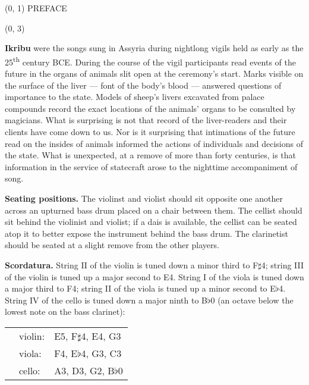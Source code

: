 \documentclass[10pt]{article}
\begin{document}
\begin{textblock}{23}(0, 1)
\center \huge PREFACE
\end{textblock}

\begin{textblock}{23}(0, 3)

\textbf{Ikribu} were the songs sung in Assyria during nightlong vigils held as
early as the 25\textsuperscript{th} century BCE. During the course of the vigil
participants read events of the future in the organs of animals slit open at
the ceremony's start. Marks visible on the surface of the liver --- font of the
body's blood --- answered questions of importance to the state. Models of
sheep's livers excavated from palace compounds record the exact locations of
the animals' organs to be consulted by magicians. What is surprising is not
that record of the liver-readers and their clients have come down to us. Nor is
it surprising that intimations of the future read on the insides of animals
informed the actions of individuals and decisions of the state. What is
unexpected, at a remove of more than forty centuries, is that information in
the service of statecraft arose to the nighttime accompaniment of song.

\textbf{Seating positions.} The violinst and violist should sit opposite one
another across an upturned bass drum placed on a chair between them. The
cellist should sit behind the violinist and violist; if a dais is available,
the cellist can be seated atop it to better expose the instrument behind the
bass drum. The clarinetist should be seated at a slight remove from the other
players.

\textbf{Scordatura.} String II of the violin is tuned down a minor third to
F$\sharp$4; string III of the violin is tuned up a major second to E4. String I
of the viola is tuned down a major third to F4; string II of the viola is tuned
up a minor second to E$\flat$4. String IV of the cello is tuned down a major
ninth to B$\flat$0 (an octave below the lowest note on the bass clarinet):

\begin{tabu}{l l l}
\phantom{M} & violin: & E5, F$\sharp$4, E4, G3 \\
            & viola: & F4, E$\flat$4, G3, C3 \\
            & cello: & A3, D3, G2, B$\flat$0 \\
\end{tabu}


\end{textblock}
\end{document}

